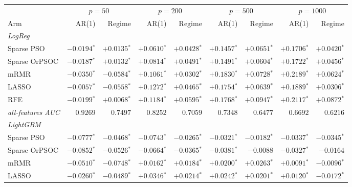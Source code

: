 \begin{table}[htbp]
    \centering
    \small\setlength{\tabcolsep}{4pt}
    \begin{tabular}{lrrrrrrrr}
    \hline
    & \multicolumn{2}{c}{$p = 50$} & \multicolumn{2}{c}{$p = 200$} & \multicolumn{2}{c}{$p = 500$} & \multicolumn{2}{c}{$p = 1000$} \\
    Arm & AR(1) & Regime & AR(1) & Regime & AR(1) & Regime & AR(1) & Regime \\
    \hline
    \multicolumn{9}{l}{\textit{LogReg}} \\
    Sparse PSO & $-0.0194$$^{*}$ & $+0.0135$$^{*}$ & $+0.0610$$^{*}$ & $+0.0428$$^{*}$ & $+0.1457$$^{*}$ & $+0.0651$$^{*}$ & $+0.1706$$^{*}$ & $+0.0420$$^{*}$ \\
    Sparse OrPSOC & $-0.0187$$^{*}$ & $+0.0132$$^{*}$ & $+0.0814$$^{*}$ & $+0.0491$$^{*}$ & $+0.1491$$^{*}$ & $+0.0604$$^{*}$ & $+0.1722$$^{*}$ & $+0.0456$$^{*}$ \\
    mRMR & $-0.0350$$^{*}$ & $-0.0584$$^{*}$ & $+0.1061$$^{*}$ & $+0.0302$$^{*}$ & $+0.1830$$^{*}$ & $+0.0728$$^{*}$ & $+0.2189$$^{*}$ & $+0.0624$$^{*}$ \\
    LASSO & $-0.0057$$^{*}$ & $-0.0558$$^{*}$ & $+0.1272$$^{*}$ & $+0.0465$$^{*}$ & $+0.1754$$^{*}$ & $+0.0639$$^{*}$ & $+0.1889$$^{*}$ & $+0.0306$$^{*}$ \\
    RFE & $-0.0199$$^{*}$ & $+0.0068$$^{*}$ & $+0.1184$$^{*}$ & $+0.0595$$^{*}$ & $+0.1768$$^{*}$ & $+0.0947$$^{*}$ & $+0.2117$$^{*}$ & $+0.0872$$^{*}$ \\
    \emph{all-features AUC} & $0.9269$ & $0.7497$ & $0.8252$ & $0.7059$ & $0.7348$ & $0.6477$ & $0.6692$ & $0.6216$ \\
    \hline
    \multicolumn{9}{l}{\textit{LightGBM}} \\
    Sparse PSO & $-0.0777$$^{*}$ & $-0.0468$$^{*}$ & $-0.0743$$^{*}$ & $-0.0265$$^{*}$ & $-0.0321$$^{*}$ & $-0.0182$$^{*}$ & $-0.0337$$^{*}$ & $-0.0345$$^{*}$ \\
    Sparse OrPSOC & $-0.0852$$^{*}$ & $-0.0526$$^{*}$ & $-0.0664$$^{*}$ & $-0.0365$$^{*}$ & $-0.0381$$^{*}$ & $-0.0088$ & $-0.0327$$^{*}$ & $-0.0164$ \\
    mRMR & $-0.0510$$^{*}$ & $-0.0748$$^{*}$ & $+0.0162$$^{*}$ & $+0.0184$$^{*}$ & $+0.0200$$^{*}$ & $+0.0263$$^{*}$ & $+0.0091$$^{*}$ & $-0.0096$$^{*}$ \\
    LASSO & $-0.0260$$^{*}$ & $-0.0489$$^{*}$ & $+0.0346$$^{*}$ & $+0.0214$$^{*}$ & $+0.0242$$^{*}$ & $+0.0201$$^{*}$ & $+0.0120$$^{*}$ & $-0.0172$$^{*}$ \\

\end{tabular}
\end{table}

